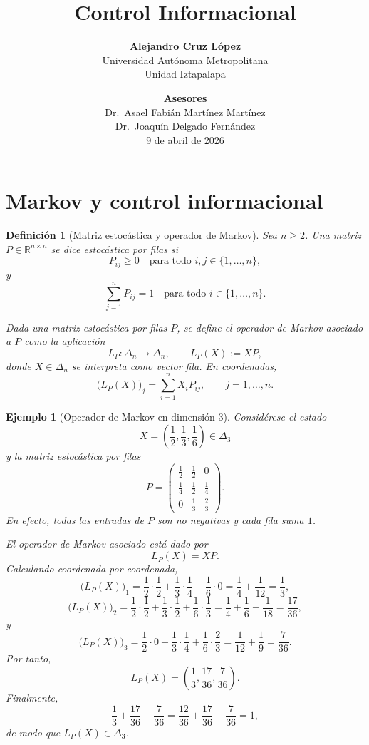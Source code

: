 \documentclass[12pt]{article}
\title{Control Informacional}
\author{
\textbf{Alejandro Cruz López} \\
Universidad Autónoma Metropolitana \\
Unidad Iztapalapa
}
\date{
\vspace{1em}
\textbf{Asesores} \\[0.3em]
Dr.\ Asael Fabián Martínez Martínez \\
Dr.\ Joaquín Delgado Fernández \\
\vspace{1em}
9 de abril de 2026
}
\newtheorem{definicion}{Definición}[section]
\newtheorem{ejemplo}{Ejemplo}[section]
\begin{document}
\maketitle
\section{Markov y control informacional}
\begin{definicion}[Matriz estocástica y operador de Markov]
Sea \(n\geq 2\). Una matriz \(P\in\mathbb{R}^{n\times n}\) se dice
\emph{estocástica por filas} si
\[
P_{ij}\geq 0
\quad\text{para todo } i,j\in\{1,\dots,n\},
\]
y
\[
\sum_{j=1}^{n}P_{ij}=1
\quad\text{para todo } i\in\{1,\dots,n\}.
\]

Dada una matriz estocástica por filas \(P\), se define el operador de Markov
asociado a \(P\) como la aplicación
\[
L_P:\Delta_n\longrightarrow \Delta_n,
\qquad
L_P(X):=XP,
\]
donde \(X\in\Delta_n\) se interpreta como vector fila. En coordenadas,
\[
\bigl(L_P(X)\bigr)_j
=
\sum_{i=1}^{n}X_iP_{ij},
\qquad
j=1,\dots,n.
\]
\end{definicion}
\begin{ejemplo}[Operador de Markov en dimensión \(3\)]
Considérese el estado
\[
X=\left(\frac{1}{2},\frac{1}{3},\frac{1}{6}\right)\in\Delta_3
\]
y la matriz estocástica por filas
\[
P=
\begin{pmatrix}
\frac{1}{2} & \frac{1}{2} & 0 \\[0.3em]
\frac{1}{4} & \frac{1}{2} & \frac{1}{4} \\[0.3em]
0 & \frac{1}{3} & \frac{2}{3}
\end{pmatrix}.
\]
En efecto, todas las entradas de \(P\) son no negativas y cada fila suma \(1\).

El operador de Markov asociado está dado por
\[
L_P(X)=XP.
\]
Calculando coordenada por coordenada,
\[
\bigl(L_P(X)\bigr)_1
=
\frac{1}{2}\cdot\frac{1}{2}
+
\frac{1}{3}\cdot\frac{1}{4}
+
\frac{1}{6}\cdot 0
=
\frac{1}{4}+\frac{1}{12}
=
\frac{1}{3},
\]
\[
\bigl(L_P(X)\bigr)_2
=
\frac{1}{2}\cdot\frac{1}{2}
+
\frac{1}{3}\cdot\frac{1}{2}
+
\frac{1}{6}\cdot\frac{1}{3}
=
\frac{1}{4}+\frac{1}{6}+\frac{1}{18}
=
\frac{17}{36},
\]
y
\[
\bigl(L_P(X)\bigr)_3
=
\frac{1}{2}\cdot 0
+
\frac{1}{3}\cdot\frac{1}{4}
+
\frac{1}{6}\cdot\frac{2}{3}
=
\frac{1}{12}+\frac{1}{9}
=
\frac{7}{36}.
\]
Por tanto,
\[
L_P(X)
=
\left(
\frac{1}{3},
\frac{17}{36},
\frac{7}{36}
\right).
\]
Finalmente,
\[
\frac{1}{3}+\frac{17}{36}+\frac{7}{36}
=
\frac{12}{36}+\frac{17}{36}+\frac{7}{36}
=
1,
\]
de modo que \(L_P(X)\in\Delta_3\).
\end{ejemplo}
\end{document}
